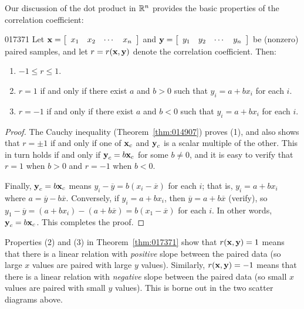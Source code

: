 Our discussion of the dot product in $\mathbb{R}^n$ provides the basic properties of the correlation coefficient:

\begin{theorem}{}{017371} %
Let $\textbf{x} = 
\left[ \begin{array}{cccc}
x_{1} & x_{2} & \cdots & x_{n}
\end{array} \right]$ and $\textbf{y} = 
\left[ \begin{array}{cccc}
y_{1} & y_{2} & \cdots & y_{n}
\end{array} \right]$ be (nonzero) paired samples, and let $r = r(\textbf{x}, \textbf{y})$ denote the correlation coefficient. Then:

\begin{enumerate}
\item $-1 \leq r \leq 1$.

\item $r = 1$ if and only if there exist $a$ and $b > 0$ such that $y_i = a + bx_i$ for each $i$.

\item $r = -1$ if and only if there exist $a$ and $b < 0$ such that $y_i = a + bx_i$ for each $i$.
\end{enumerate}
\end{theorem}

\begin{proof}
The Cauchy inequality (Theorem~\ref{thm:014907}) proves (1), and also shows that $r = \pm 1$ if and only if one of $\textbf{x}_{c}$ and $\textbf{y}_{c}$ is a scalar multiple of the other. This in turn holds if and only if $\textbf{y}_{c} = b\textbf{x}_{c}$ for some $b \neq 0$, and it is easy to verify that $r = 1$ when $b > 0$ and $r = -1$ when $b < 0$.

Finally, $\textbf{y}_{c} = b\textbf{x}_{c}$ means $y_i - \overline{y} = b(x_i - \overline{x})$ for each $i$; that is, $y_{i} = a + bx_{i}$ where $a = \overline{y} - b\overline{x}$. Conversely, if $y_{i} = a + bx_{i}$, then $\overline{y} = a + b\overline{x}$ (verify), so $y_1 - \overline{y} = (a + bx_i) - (a + b\overline{x}) = b(x_1 - \overline{x})$ for each $i$. In other words, $\textbf{y}_{c} = b\textbf{x}_{c}$. This completes the proof.
\end{proof}

Properties (2) and (3) in Theorem~\ref{thm:017371} show that $r(\textbf{x}, \textbf{y}) = 1$ means that there is a linear relation with \textit{positive} slope between the paired data (so large $x$ values are paired with large $y$ values). Similarly, $r(\textbf{x}, \textbf{y}) = -1$ means that there is a linear relation with \textit{negative} slope between the paired data (so small $x$ values are paired with small $y$ values). This is borne out in the two scatter diagrams above.

